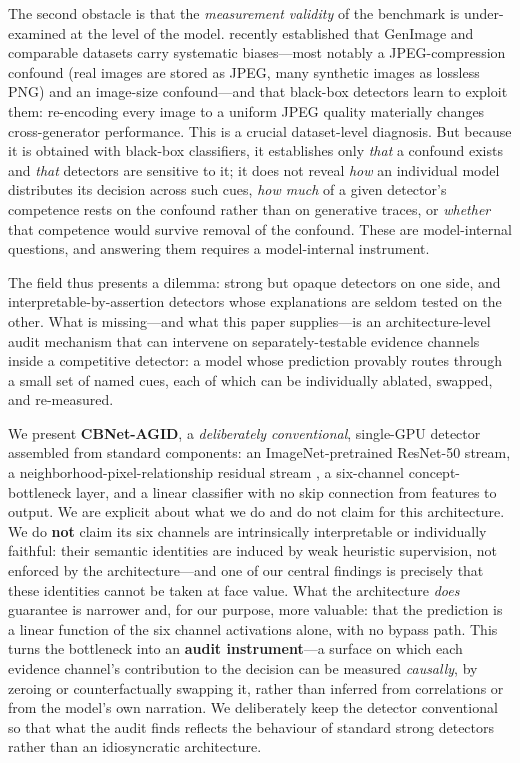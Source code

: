 The second obstacle is that the \emph{measurement validity} of the benchmark is under-examined at the level of the model. \citet{grommelt2024fakejpeg} recently established that GenImage and comparable datasets carry systematic biases---most notably a JPEG-compression confound (real images are stored as JPEG, many synthetic images as lossless PNG) and an image-size confound---and that black-box detectors learn to exploit them: re-encoding every image to a uniform JPEG quality materially changes cross-generator performance. This is a crucial dataset-level diagnosis. But because it is obtained with black-box classifiers, it establishes only \emph{that} a confound exists and \emph{that} detectors are sensitive to it; it does not reveal \emph{how} an individual model distributes its decision across such cues, \emph{how much} of a given detector's competence rests on the confound rather than on generative traces, or \emph{whether} that competence would survive removal of the confound. These are model-internal questions, and answering them requires a model-internal instrument.

The field thus presents a dilemma: strong but opaque detectors on one side, and interpretable-by-assertion detectors whose explanations are seldom tested on the other. What is missing---and what this paper supplies---is an architecture-level audit mechanism that can intervene on separately-testable evidence channels inside a competitive detector: a model whose prediction provably routes through a small set of named cues, each of which can be individually ablated, swapped, and re-measured.

We present \textbf{CBNet-AGID}, a \emph{deliberately conventional}, single-GPU detector assembled from standard components: an ImageNet-pretrained ResNet-50 stream, a neighborhood-pixel-relationship residual stream \citep{tan2024npr}, a six-channel concept-bottleneck layer, and a linear classifier with no skip connection from features to output. We are explicit about what we do and do not claim for this architecture. We do \textbf{not} claim its six channels are intrinsically interpretable or individually faithful: their semantic identities are induced by weak heuristic supervision, not enforced by the architecture---and one of our central findings is precisely that these identities cannot be taken at face value. What the architecture \emph{does} guarantee is narrower and, for our purpose, more valuable: that the prediction is a linear function of the six channel activations alone, with no bypass path. This turns the bottleneck into an \textbf{audit instrument}---a surface on which each evidence channel's contribution to the decision can be measured \emph{causally}, by zeroing or counterfactually swapping it, rather than inferred from correlations or from the model's own narration. We deliberately keep the detector conventional so that what the audit finds reflects the behaviour of standard strong detectors rather than an idiosyncratic architecture.

